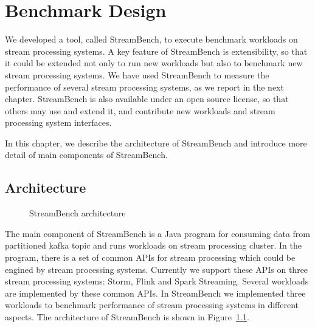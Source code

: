 \chapter{Benchmark Design}
We developed a tool, called StreamBench, to execute benchmark workloads on stream processing systems. A key feature of StreamBench is extensibility, so that it could be extended not only to run new workloads but also to benchmark new stream processing systems. We have used StreamBench to measure the performance of several stream processing systems, as we report in the next chapter.  StreamBench is also available under an open source license, so that others may use and extend it, and contribute new workloads and stream processing system interfaces.

In this chapter, we describe the architecture of StreamBench and introduce more detail of main components of StreamBench. 

\section{Architecture}

\begin{figure}
  \begin{center}
   \caption{StreamBench architecture}
   \label{fig:streambench_architecture}
  \end{center}
\end{figure}

The main component of StreamBench is a Java program for consuming data from partitioned kafka topic and runs workloads on stream processing cluster. In the program, there is a set of common APIs for stream processing which could be engined by stream processing systems. Currently we support these APIs on three stream processing systems: Storm, Flink and Spark Streaming. Several workloads are implemented by these common APIs. In StreamBench we implemented three workloads to benchmark performance of stream processing systems in different aspects. The architecture of StreamBench is shown in Figure~\ref{fig:streambench_architecture}. 

